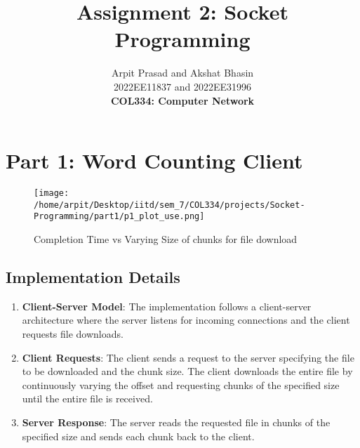 \documentclass[12pt]{article}
\begin{document}
 
 
\title{\textbf{Assignment 2: Socket Programming}}
\author{Arpit Prasad and Akshat Bhasin\\ 2022EE11837 and 2022EE31996 \\
\textbf{COL334: Computer Network}}

\maketitle
\section{Part 1: Word Counting Client}

\begin{figure}[h!]
    \centering
    \texttt{[image: /home/arpit/Desktop/iitd/sem\_7/COL334/projects/Socket-Programming/part1/p1\_plot\_use.png]}
    \caption{Completion Time vs Varying Size of chunks for file download}
    \label{fig:part1_output}
\end{figure}

\subsection{Implementation Details}
\begin{enumerate}
    \item \textbf{Client-Server Model}: The implementation follows a client-server architecture where the server listens for incoming connections and the client requests file downloads.
    \item \textbf{Client Requests}: The client sends a request to the server specifying the file to be downloaded and the chunk size. The client downloads the entire file by continuously varying the offset and requesting chunks of the specified size until the entire file is received.
    \item \textbf{Server Response}: The server reads the requested file in chunks of the specified size and sends each chunk back to the client.
\end{enumerate}
\end{document}
